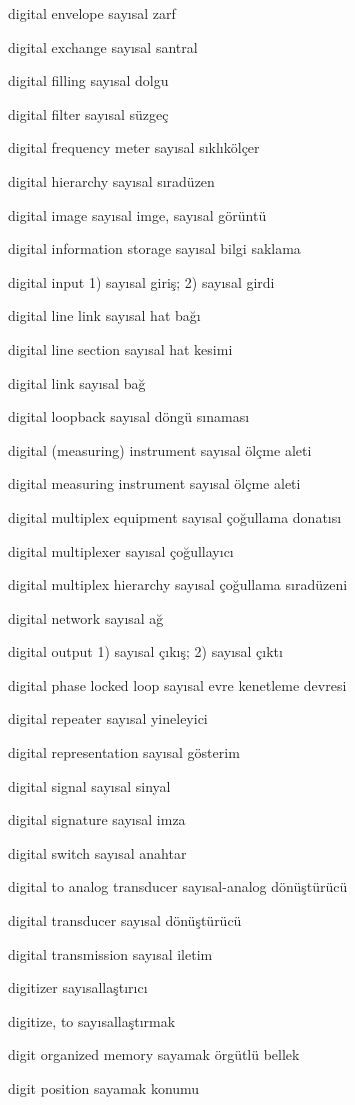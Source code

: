 \documentclass[12pt,fleqn]{article}\usepackage{../../common}
\begin{document}
digital envelope sayısal zarf

digital exchange sayısal santral

digital filling sayısal dolgu

digital filter sayısal süzgeç

digital frequency meter sayısal sıklıkölçer

digital hierarchy sayısal sıradüzen

digital image sayısal imge, sayısal görüntü

digital information storage sayısal bilgi saklama

digital input 1) sayısal giriş; 2) sayısal girdi

digital line link sayısal hat bağı

digital line section sayısal hat kesimi

digital link sayısal bağ

digital loopback sayısal döngü sınaması

digital (measuring) instrument sayısal ölçme aleti

digital measuring instrument sayısal ölçme aleti

digital multiplex equipment sayısal çoğullama donatısı

digital multiplexer sayısal çoğullayıcı

digital multiplex hierarchy sayısal çoğullama sıradüzeni

digital network sayısal ağ

digital output 1) sayısal çıkış; 2) sayısal çıktı

digital phase locked loop sayısal evre kenetleme devresi

digital repeater sayısal yineleyici

digital representation sayısal gösterim

digital signal sayısal sinyal

digital signature sayısal imza

digital switch sayısal anahtar

digital to analog transducer sayısal-analog dönüştürücü

digital transducer sayısal dönüştürücü

digital transmission sayısal iletim

digitizer sayısallaştırıcı

digitize, to sayısallaştırmak

digit organized memory sayamak örgütlü bellek

digit position sayamak konumu
\end{document}
